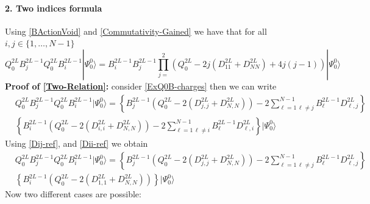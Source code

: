 \documentclass[10pt]{article}
\numberwithin{equation}{section}
\numberwithin{equation}{subsection}
\begin{document}
\paragraph{2. Two indices formula}
Using \eqref{BActionVoid} and \eqref{Commutativity-Gained} we have that for all $i,j\in\{1,\ldots,N-1\}$
\begin{equation}\label{Two-Relation}
	Q_{0}^{2L}B_{j}^{2L-1}Q_{0}^{2L}B_{i}^{2L-1}|\Psi_{0}^{0}\rangle=B_{i}^{2L-1}B_{j}^{2L-1}\prod_{j=}^{2}\left(Q_{0}^{2L}-2j(D_{11}^{2L}+D_{NN}^{2L})+4j(j-1)\right)|\Psi_{0}^{0}\rangle
\end{equation}
\textbf{Proof of \eqref{Two-Relation}:}
consider \eqref{ExQ0B-charges} then we can write 
\begin{align}
	&Q_{0}^{2L}B_{j}^{2L-1}Q_{0}^{2L}B_{i}^{2L-1}|\Psi_{0}^{0}\rangle=\left\{B_{j}^{2L-1}\left(Q_{0}^{2L}-2(D_{j,j}^{2L}+D_{N,N}^{2L})\right)-2\sum_{\ell=1\,\ell\neq j}^{N-1}B_{\ell}^{2L-1}D_{\ell,j}^{2L}\right\}\nonumber\\&\left\{B_{i}^{2L-1}\left(Q_{0}^{2L}-2(D_{i,i}^{2L}+D_{N,N}^{2L})\right)-2\sum_{\ell=1\,\ell\neq i}^{N-1}B_{\ell}^{2L-1}D_{\ell,i}^{2L}\right\}|\Psi_{0}^{0}\rangle
\end{align}
Using \eqref{Dij-ref}, and \eqref{Dii-ref} we obtain 
\begin{align}
	&Q_{0}^{2L}B_{j}^{2L-1}Q_{0}^{2L}B_{i}^{2L-1}|\Psi_{0}^{0}\rangle=\left\{B_{j}^{2L-1}\left(Q_{0}^{2L}-2(D_{j,j}^{2L}+D_{N,N}^{2L})\right)-2\sum_{\ell=1\,\ell\neq j}^{N-1}B_{\ell}^{2L-1}D_{\ell,j}^{2L}\right\}\nonumber\\&\left\{B_{i}^{2L-1}\left(Q_{0}^{2L}-2(D_{1,1}^{2L}+D_{N,N}^{2L})\right)\right\}|\Psi_{0}^{0}\rangle
\end{align}
Now two different cases are possible:
\end{document}
